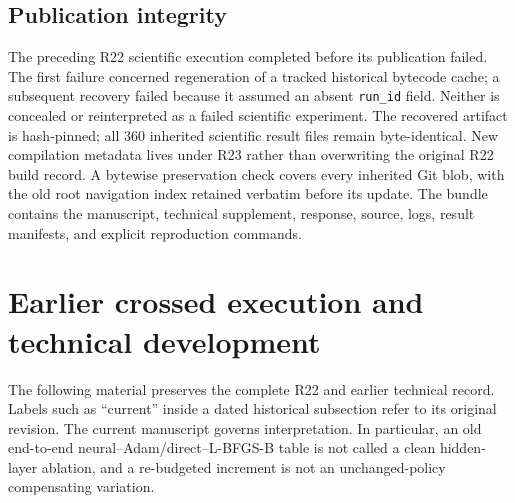 \subsection{Publication integrity}
The preceding R22 scientific execution completed before its publication failed. The first failure concerned regeneration of a tracked historical bytecode cache; a subsequent recovery failed because it assumed an absent \texttt{run\_id} field. Neither is concealed or reinterpreted as a failed scientific experiment. The recovered artifact is hash-pinned; all 360 inherited scientific result files remain byte-identical. New compilation metadata lives under R23 rather than overwriting the original R22 build record. A bytewise preservation check covers every inherited Git blob, with the old root navigation index retained verbatim before its update. The bundle contains the manuscript, technical supplement, response, source, logs, result manifests, and explicit reproduction commands.

\section{Earlier crossed execution and technical development}
The following material preserves the complete R22 and earlier technical record. Labels such as ``current'' inside a dated historical subsection refer to its original revision. The current manuscript governs interpretation. In particular, an old end-to-end neural--Adam/direct--L-BFGS-B table is not called a clean hidden-layer ablation, and a re-budgeted increment is not an unchanged-policy compensating variation.
